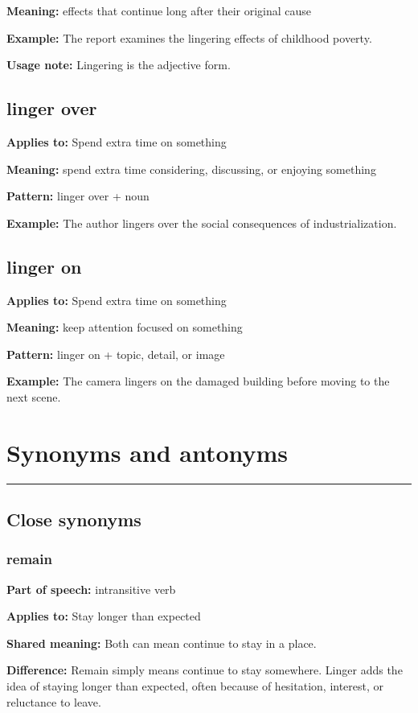 \documentclass[11pt]{article}
\newcommand{\sectionrule}{\par\vspace{-0.5em}\noindent\textcolor{Accent}{\rule{\linewidth}{0.6pt}}\par}
\begin{document}
\textbf{Meaning:} effects that continue long after their original cause

\textbf{Example:} The report examines the lingering effects of childhood poverty.

\textbf{Usage note:} Lingering is the adjective form.

\subsection{linger over}
\textbf{Applies to:} Spend extra time on something

\textbf{Meaning:} spend extra time considering, discussing, or enjoying something

\textbf{Pattern:} linger over + noun

\textbf{Example:} The author lingers over the social consequences of industrialization.

\subsection{linger on}
\textbf{Applies to:} Spend extra time on something

\textbf{Meaning:} keep attention focused on something

\textbf{Pattern:} linger on + topic, detail, or image

\textbf{Example:} The camera lingers on the damaged building before moving to the next scene.

\section{Synonyms and antonyms}
\sectionrule
\subsection{Close synonyms}
\subsubsection{remain}
\textbf{Part of speech:} intransitive verb

\textbf{Applies to:} Stay longer than expected

\textbf{Shared meaning:} Both can mean continue to stay in a place.

\textbf{Difference:} Remain simply means continue to stay somewhere. Linger adds the idea of staying longer than expected, often because of hesitation, interest, or reluctance to leave.
\end{document}
